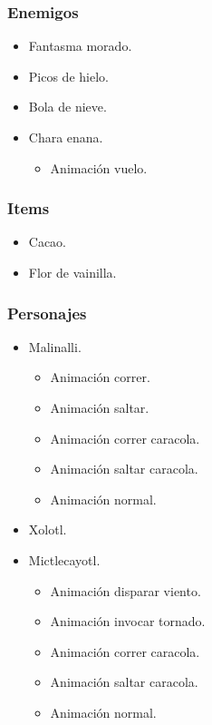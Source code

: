 \documentclass[11pt,letterpaper]{article}
\begin{document}
\begin{itemize}
        \subsubsection{Enemigos}
\begin{itemize}
        \item Fantasma morado. 
        \item Picos de hielo. 
        \item Bola de nieve.
        \item Chara enana.
\begin{itemize}
        \item   Animación vuelo.
\end{itemize}			
\end{itemize}
        \subsubsection{Items}
\begin{itemize}
        \item   Cacao.
        \item Flor de vainilla.
\end{itemize}
        \subsubsection{Personajes}
        \begin{itemize}
                \item Malinalli.
                \begin{itemize}
                        \item Animación correr.
                        \item Animación saltar.
                        \item Animación correr caracola.
                        \item Animación saltar caracola.
                        \item Animación normal.
                \end{itemize} 
                \item Xolotl. 
                \item Mictlecayotl.
                \begin{itemize}
                        \item Animación disparar viento.
                        \item Animación invocar tornado.
                        \item Animación correr caracola.
                        \item Animación saltar caracola.
                        \item Animación normal.
                \end{itemize} 
        \end{itemize}

\end{itemize}
\end{document}
